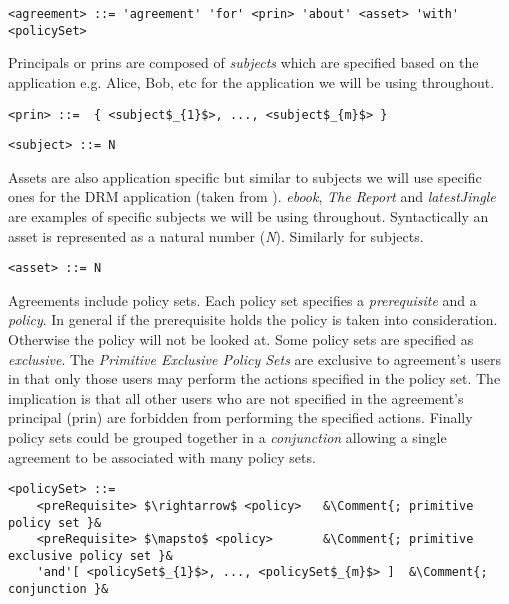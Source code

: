 \lstset{language=AST}
\begin{lstlisting}[frame=single, caption={agreement},label={lst:agreementast}]
<agreement> ::= 'agreement' 'for' <prin> 'about' <asset> 'with' <policySet> 
\end{lstlisting}

Principals or prins are composed of \emph{subjects} which are specified based on the application e.g. Alice, Bob, etc for the %
application we will be using throughout.

\lstset{mathescape, language=AST}  
\begin{lstlisting}[frame=single, caption={prin},label={lst:prinast}]
<prin> ::=  { <subject$_{1}$>, ..., <subject$_{m}$> }
\end{lstlisting}

\lstset{mathescape, language=AST}  
\begin{lstlisting}[frame=single, caption={subject},label={lst:subjectast}]
<subject> ::= N
\end{lstlisting}

Assets are also application specific but similar to subjects we will use specific ones for the DRM application (taken from \cite{pucella2006}). \emph{ebook}, \emph{The Report} and \emph{latestJingle} are examples of specific subjects we will be using throughout. Syntactically an asset is represented as a natural number (\emph{N}). Similarly for subjects.

\lstset{mathescape, language=AST}  
\begin{lstlisting}[frame=single, caption={asset},label={lst:assetast}]
<asset> ::= N
\end{lstlisting}

Agreements include policy sets. Each policy set specifies a \emph{prerequisite} and a \emph{policy}. In general if the prerequisite holds the policy is taken into consideration. Otherwise the policy will not be looked at. Some policy sets are specified as \emph{exclusive}. The \emph{Primitive Exclusive Policy Sets} are exclusive to agreement's users in that only those users may perform the actions specified in the policy set. The implication is that all other users who are not specified in the agreement's principal (prin) are forbidden from performing the specified actions. Finally policy sets could be grouped together in a \emph{conjunction} allowing a single agreement to be associated with many policy sets. 


\newcommand*{\Comment}[1]{\hfill\makebox[7.0cm][l]{#1}}%
\lstset{mathescape, language=AST, escapechar=\&}  
\begin{lstlisting}[frame=single, caption={policySet},label={lst:policySetast}]
<policySet> ::=  
	<preRequisite> $\rightarrow$ <policy>	&\Comment{; primitive policy set }&
	<preRequisite> $\mapsto$ <policy>		&\Comment{; primitive exclusive policy set }&
	'and'[ <policySet$_{1}$>, ..., <policySet$_{m}$> ]	&\Comment{; conjunction }&
\end{lstlisting}


